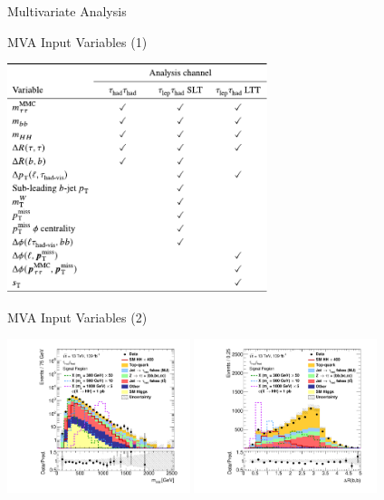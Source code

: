 \documentclass[11pt, xcolor={dvipsnames}, aspectratio=169]{beamer}
\begin{document}

\begin{frame}[standout]
  Multivariate Analysis
\end{frame}


\begin{frame}{MVA Input Variables (1)}
  \centering

  \includegraphics[width=0.57\textwidth]{mva_input_table}
\end{frame}


\begin{frame}{MVA Input Variables (2)}
  \centering

  \includegraphics[width=0.4\textwidth]{mva/prefit/Region_BMin0_incJet1_distmHH_J2_Y2015_DLLOS_T2_SpcTauHH_L0_Prefit_logy}%
  \includegraphics[width=0.4\textwidth]{mva/prefit/Region_BMin0_incJet1_distdRBB_J2_Y2015_DLLOS_T2_SpcTauHH_L0_Prefit_fontembed}
\end{frame}
\end{document}
